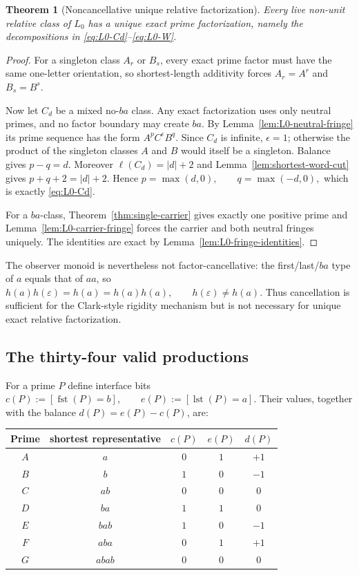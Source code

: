 \documentclass[11pt,a4paper]{article}
\newtheorem{theorem}{Theorem}[section]
\newcommand{\eps}{\varepsilon}
\newcommand{\fst}{\operatorname{fst}}
\newcommand{\lst}{\operatorname{lst}}
\begin{document}
\begin{theorem}[Noncancellative unique relative factorization]
\label{thm:L0-UF}
Every live non-unit relative class of $L_0$ has a unique exact prime
factorization, namely the decompositions in \eqref{eq:L0-Cd}--\eqref{eq:L0-W}.
\end{theorem}

\begin{proof}
For a singleton class $A_r$ or $B_s$, every exact prime factor must
have the same one-letter orientation, so shortest-length additivity
forces $A_r=A^r$ and $B_s=B^s$.

Now let $C_d$ be a mixed no-$ba$ class.  Any exact factorization uses
only neutral primes, and no factor boundary may create $ba$.  By
Lemma~\ref{lem:L0-neutral-fringe} its prime sequence has the form
$A^pC^\epsilon B^q$.  Since $C_d$ is infinite, $\epsilon=1$; otherwise
the product of the singleton classes $A$ and $B$ would itself be a
singleton.  Balance gives $p-q=d$.  Moreover
\(\ell(C_d)=|d|+2\)
and Lemma~\ref{lem:shortest-word-cut} gives $p+q+2=|d|+2$.  Hence
\(p=\max(d,0),\qquad q=\max(-d,0),\)
which is exactly \eqref{eq:L0-Cd}.

For a $ba$-class, Theorem~\ref{thm:single-carrier} gives exactly one positive
prime and Lemma~\ref{lem:L0-carrier-fringe} forces the carrier and both
neutral fringes uniquely.  The identities are exact by
Lemma~\ref{lem:L0-fringe-identities}.
\end{proof}

The observer monoid is nevertheless not factor-cancellative: the
first/last/$ba$ type of $a$ equals that of $aa$, so
\(h(a)h(\eps)=h(a)=h(a)h(a), \qquad h(\eps)\ne h(a).\)
Thus cancellation is sufficient for the Clark-style rigidity mechanism
but is not necessary for unique exact relative factorization.

\subsection{The thirty-four valid productions}

For a prime $P$ define interface bits
\(c(P):=[\fst(P)=b], \qquad e(P):=[\lst(P)=a].\)
Their values, together with the balance
$d(P)=e(P)-c(P)$, are:

\begin{center}
\begin{tabular}{c c c c c}
\toprule
Prime & shortest representative & $c(P)$ & $e(P)$ & $d(P)$\\
\midrule
$A$ & $a$ & $0$ & $1$ & $+1$\\
$B$ & $b$ & $1$ & $0$ & $-1$\\
$C$ & $ab$ & $0$ & $0$ & $0$\\
$D$ & $ba$ & $1$ & $1$ & $0$\\
$E$ & $bab$ & $1$ & $0$ & $-1$\\
$F$ & $aba$ & $0$ & $1$ & $+1$\\
$G$ & $abab$ & $0$ & $0$ & $0$\\
\bottomrule
\end{tabular}
\end{center}
\end{document}
